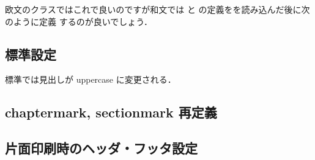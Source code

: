 
欧文のクラスではこれで良いのですが和文では  
と の定義をを読み込んだ後に次のように定義
するのが良いでしょう．

\begin{intext}
 \def\chaptermark#1{\markboth{%
   \ifnum \c@secnumdepth >\m@ne
     \if@mainmatter
       \@chapapp\thechapter\@chappos\hskip1zw
     \fi
   \fi
   #1}{}}%
  \def\sectionmark#1{\markright{%
    \ifnum \c@secnumdepth >\z@ \thesection \hskip1zw\fi
    #1}}%
\end{intext}

\subsection{標準設定}
\begin{intext}
\usepackage{fancyhdr} 
\usepackage{fancy}
\fancyhead[LE,RO]{\slshape \rightmark}
\fancyfoot[LE,RE]{\slshape \leftmark}
\renewcommand*{\headrulewidth}{0.4pt}
\renewcommand*{\footrulewidth}{0.4pt}
\end{intext}

標準では見出しが uppercase に変更される．

\begin{usage}
\lhead{\nouppercase{\rightmark}} 
\rhead{\nouppercase{\leftmark}}
\end{usage}

\subsection{chaptermark, sectionmark 再定義}

\begin{intext}
\renewcommand{\chaptermark}[1]{%
   \markboth{\chaptername\ \thechapter.\ #1}{}}
\end{intext}

\subsection{片面印刷時のヘッダ・フッタ設定}

%
\begin{usage}
\end{usage}

